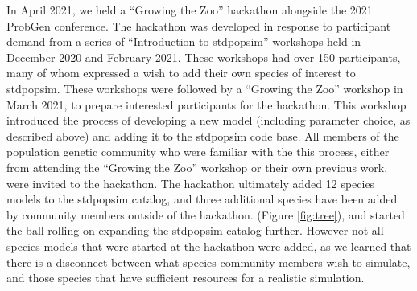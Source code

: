 \documentclass[hidelinks]{article}
\begin{document}
In April 2021, we held a ``Growing the Zoo'' hackathon 
alongside the 2021 ProbGen conference. 
The hackathon was developed in response to participant demand from a
series of ``Introduction to stdpopsim'' workshops held in December 2020 and
February 2021. These workshops had over 150 participants, many of whom
expressed a wish to add their own species of interest to stdpopsim.
These workshops were followed by a ``Growing the Zoo'' workshop in
March 2021, to prepare interested participants for the hackathon. This
workshop introduced the process of developing a new model (including
parameter choice, as described above) and adding it to the stdpopsim
code base. All members of the population genetic community who were 
familiar with the this process, either from attending the
``Growing the Zoo'' workshop or their own previous work, were invited to
the hackathon. The hackathon ultimately added 12 species models to
the stdpopsim catalog, and three additional species have been added by
community members outside of the hackathon. (Figure \ref{fig:tree}),
and started the ball rolling on expanding the
stdpopsim catalog further. However not all species models that were started
at the hackathon were added, as we learned that there is a disconnect
between what species community members wish to simulate, and those
species that have sufficient resources for a realistic simulation.
\end{document}
